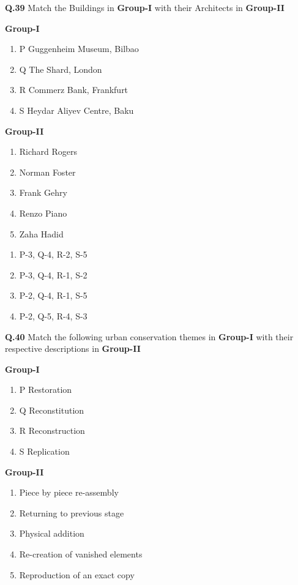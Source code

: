 \documentclass{article}
\begin{document}
\noindent
\textbf{Q.39} Match the Buildings in \textbf{Group-I} with their Architects in \textbf{Group-II}
\begin{multicols}{2}
    

\textbf{Group-I}
\begin{enumerate}[label=\Alph*., leftmargin=1.5cm]
\item P Guggenheim Museum, Bilbao
\item Q The Shard, London
\item R Commerz Bank, Frankfurt
\item S Heydar Aliyev Centre, Baku
\end{enumerate}
\columnbreak
\noindent
\hspace{1cm}
\textbf{Group-II}
\begin{enumerate}[label=\arabic*., leftmargin=1.5cm]
\item Richard Rogers
\item Norman Foster
\item Frank Gehry
\item Renzo Piano
\item Zaha Hadid
\end{enumerate}
\end{multicols}

\begin{multicols}{2}
\begin{enumerate}[label=(\Alph*)]
\item P-3, Q-4, R-2, S-5
\item P-3, Q-4, R-1, S-2
\item P-2, Q-4, R-1, S-5
\item P-2, Q-5, R-4, S-3
\end{enumerate}
\end{multicols}

\vspace{1cm}

\noindent
\textbf{Q.40} Match the following urban conservation themes in \textbf{Group-I} with their respective descriptions in \textbf{Group-II}
\begin{multicols}{2}
    

\textbf{Group-I}
\begin{enumerate}[label=\Alph*., leftmargin=1.5cm]
\item P Restoration
\item Q Reconstitution
\item R Reconstruction
\item S Replication
\end{enumerate}
\columnbreak\noindent\hspace{1cm}
\textbf{Group-II}
\begin{enumerate}[label=\arabic*., leftmargin=1.5cm]
\item Piece by piece re-assembly
\item Returning to previous stage
\item Physical addition
\item Re-creation of vanished elements
\item Reproduction of an exact copy
\end{enumerate}
\end{multicols}
\end{document}
